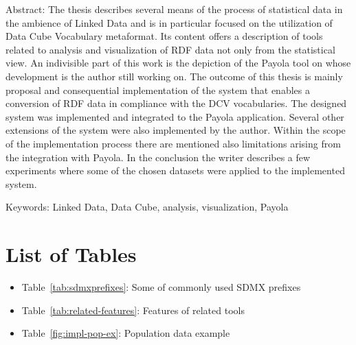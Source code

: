 \documentclass[12pt,a4paper]{report}
\let\openright=\clearpage
\def\chapwithtoc#1{
\chapter*{#1}
\addcontentsline{toc}{chapter}{#1}
}
\begin{document}
{Abstract:
The thesis describes several means of the process of statistical data in the ambience of Linked Data
and is in particular focused on the utilization of Data Cube Vocabulary metaformat.
Its content offers a description of tools related to analysis and visualization of RDF
data not only from the statistical view. An indivisible part of this work is the depiction of
the Payola tool on whose development is the author still working on. The outcome of this
thesis is mainly proposal and consequential implementation of the system that enables
a conversion of RDF data in compliance with the DCV vocabularies. The designed system
was implemented and integrated to the Payola application. Several other extensions of
the system were also implemented by the author. Within the scope of the implementation
process there are mentioned also limitations arising from the integration with Payola.
In the conclusion the writer describes a few experiments where some of the chosen
datasets were applied to the implemented system.

Keywords:
Linked Data, Data Cube, analysis, visualization, Payola

\vss}

\newpage


\openright
\pagestyle{plain}
\setcounter{page}{1}
\tableofcontents










% 





\chapwithtoc{List of Tables}
\begin{itemize}
\item Table~\ref{tab:sdmxprefixes}:  Some of commonly used SDMX prefixes
\item Table~\ref{tab:related-features}:  Features of related tools
\item Table~\ref{fig:impl-pop-ex}:  Population data example
\end{itemize}






\openright
\end{document}
